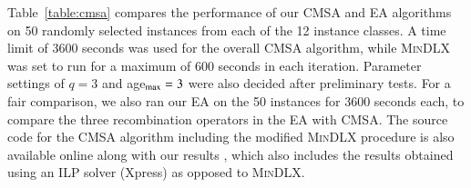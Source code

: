 \documentclass[a4paper,11pt,authoryear]{elsarticle}
\newcommand{\chng}[1]{{\color{myRed}#1}}
\begin{document}
\noindent Table~\ref{table:cmsa} compares the performance of our CMSA and EA algorithms on 50 randomly selected instances from each of the 12 instance classes. A time limit of 3600 seconds was used for the overall CMSA algorithm, while \textsc{MinDLX} was set to run for a maximum of 600 seconds in each iteration. Parameter settings of $q = 3$ and age$_{\textup{max}} = 3$ were also decided after preliminary tests. For a fair comparison, we also ran our EA on the 50 instances for 3600 seconds each, to compare the three recombination operators in the EA with CMSA. The source code for the CMSA algorithm including the modified \textsc{MinDLX} procedure is also available online along with our results \citep{hawa2019cmsa}\chng{, which also includes the results obtained using an ILP solver (Xpress) as opposed to \textsc{MinDLX}.}
\end{document}
